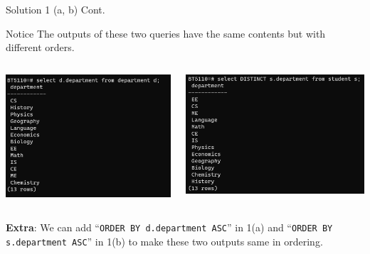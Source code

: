 \begin{frame}[fragile]{Solution 1 (a, b) Cont.}

\begin{block}{Notice}
	The outputs of these two queries have the same contents but with different orders.
\end{block}\vspace{10pt}

	\begin{columns}
		\includegraphics[width=\textwidth]{t2/images/t2-1a.png}
		
		\includegraphics[width=\textwidth]{t2/images/t2-1b.png}
	\end{columns}

\vspace{5pt}
\textbf{Extra}: We can add ``\texttt{ORDER BY d.department ASC}'' in 1(a) and ``\texttt{ORDER BY s.department ASC}'' in 1(b) to make these two outputs same in ordering.
	
\end{frame}

